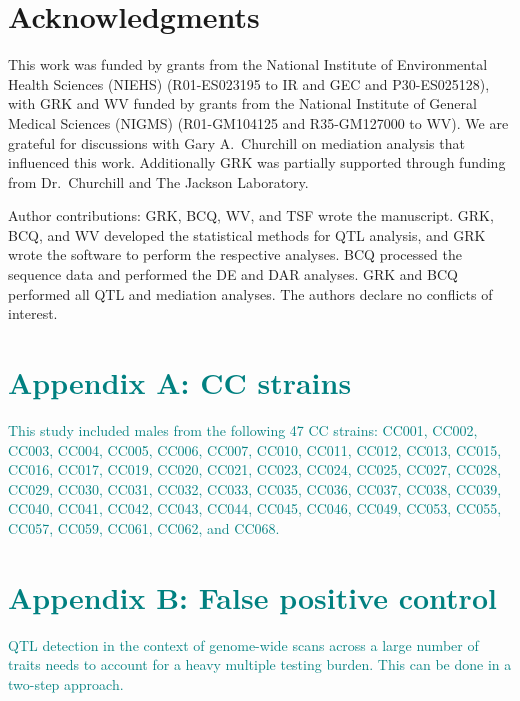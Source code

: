\documentclass[9pt,twocolumn,twoside]{gsajnl}
\newcommand{\WV}[2]{\textcolor{red}{#1\footnote{\textcolor{red}{WV: #2}}}}
\newcommand{\GKinline}[1]{\textcolor{teal}{#1}}
\begin{document}
\section{Acknowledgments}
This work was funded by grants from the National Institute of Environmental Health Sciences (NIEHS) (R01-ES023195 to IR and GEC and P30-ES025128), with GRK and WV funded by grants from the National Institute of General Medical Sciences (NIGMS) (R01-GM104125 and R35-GM127000 to WV). We are grateful for discussions with Gary A.\ Churchill on mediation analysis that influenced this work. Additionally GRK was partially supported through funding from Dr.\ Churchill and The Jackson Laboratory.

Author contributions: GRK, BCQ, WV, and TSF wrote the manuscript. GRK, BCQ, and WV developed the statistical methods for QTL analysis, and GRK wrote the software to perform the respective analyses. BCQ processed the sequence data and performed the DE and DAR analyses. GRK and BCQ performed all QTL and mediation analyses. The authors declare no conflicts of interest.



\clearpage

\section{\GKinline{Appendix A: CC strains}}

\GKinline{This study included males from the following 47 CC strains: CC001, CC002, CC003, CC004, CC005, CC006, CC007, CC010, CC011, CC012, CC013, CC015, CC016, CC017, CC019, CC020, CC021, CC023, CC024, CC025, CC027, CC028, CC029, CC030, CC031, CC032, CC033, CC035, CC036, CC037, CC038, CC039, CC040, CC041, CC042, CC043, CC044, CC045, CC046, CC049, CC053, CC055, CC057, CC059, CC061, CC062, and CC068.}

\section{\GKinline{Appendix B: False positive control}}


\GKinline{QTL detection in the context of genome-wide scans across a large number of traits needs to account for a heavy multiple testing burden. This can be done in a two-step approach.}
\end{document}
